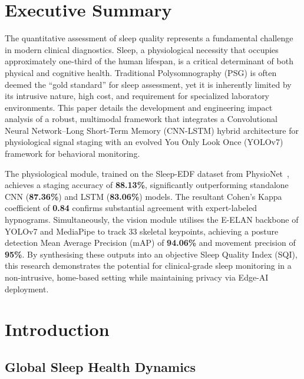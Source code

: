 \documentclass[10pt, a4paper, twocolumn]{article}
\begin{document}

\section{Executive Summary}

The quantitative assessment of sleep quality represents a fundamental challenge in
modern clinical diagnostics. Sleep, a physiological necessity that occupies
approximately one-third of the human lifespan, is a critical determinant of both
physical and cognitive health. Traditional Polysomnography (PSG) is often deemed
the ``gold standard'' for sleep assessment, yet it is inherently limited by its
intrusive nature, high cost, and requirement for specialized laboratory environments.
This paper details the development and engineering impact analysis of a robust,
multimodal framework that integrates a Convolutional Neural Network--Long
Short-Term Memory (CNN-LSTM) hybrid architecture for physiological signal staging
with an evolved You Only Look Once (YOLOv7) framework for behavioral monitoring.

The physiological module, trained on the Sleep-EDF dataset from
PhysioNet~\cite{ref5}, achieves a staging accuracy of \textbf{88.13\%},
significantly outperforming standalone CNN (\textbf{87.36\%}) and LSTM
(\textbf{83.06\%}) models. The resultant Cohen's Kappa coefficient of \textbf{0.84}
confirms substantial agreement with expert-labeled hypnograms. Simultaneously, the
vision module utilises the E-ELAN backbone of YOLOv7 and MediaPipe to track
33 skeletal keypoints, achieving a posture detection Mean Average Precision (mAP)
of \textbf{94.06\%} and movement precision of \textbf{95\%}. By synthesising these
outputs into an objective Sleep Quality Index (SQI), this research demonstrates the
potential for clinical-grade sleep monitoring in a non-intrusive, home-based setting
while maintaining privacy via Edge-AI deployment.

\section{Introduction}

\subsection{Global Sleep Health Dynamics}
\end{document}
